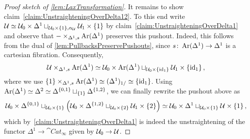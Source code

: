 \begin{proof}[Proof sketch of \cref{lem:LaxTransformation}]
	It remains to show claim~\cref{claim:UnstraighteningOverDelta12}. To this end write $\mathcal{U}\simeq \mathcal{U}_0\times\Delta^1\sqcup_{\mathcal{U}_0\times\{1\},\alpha_{\mathcal{U}}}\mathcal{U}_1\times\{1\}$ by claim~\cref{claim:UnstraighteningOverDelta1} and observe that $-\times_{\Delta^1,s}\operatorname{Ar}(\Delta^1)$ preserves this pushout. Indeed, this follows from the dual of \cref{lem:PullbacksPreservePushouts}, since $s\colon \operatorname{Ar}(\Delta^1)\rightarrow \Delta^1$ is a cartesian fibration. Consequently,
	\begin{equation*}
		\mathcal{U}\times_{\Delta^1,s}\operatorname{Ar}(\Delta^1)\simeq \mathcal{U}_0\times \operatorname{Ar}(\Delta^1)\sqcup_{\mathcal{U}_0\times \{\operatorname{id}_1\}}\mathcal{U}_1\times\{\operatorname{id}_1\}\,,
	\end{equation*}
	where we use $\{1\}\times_{\Delta^1,s}\operatorname{Ar}(\Delta^1)\simeq (\Delta^1)_{1/}\simeq \{\operatorname{id}_1\}$. Using $\operatorname{Ar}(\Delta^1)\simeq \Delta^2\simeq \Delta^{\{0,1\}}\sqcup_{\{1\}}\Delta^{\{1,2\}}$, we can finally rewrite the pushout above as
	\begin{equation*}
		\Uu_0\times\Delta^{\{0,1\}}\sqcup_{\Uu_0\times\{1\}}\left(\Uu_0\times\Delta^{\{1,2\}}\sqcup_{\Uu_0\times\{2\}}\Uu_1\times\{2\}\right)\simeq \Uu_0\times\Delta^1\sqcup_{\Uu_0\times\{1\}}\Uu\times\{1\}\,,
	\end{equation*}
	which by~\cref{claim:UnstraighteningOverDelta1} is indeed the unstraightening of the functor $\Delta^1\rightarrow \cat{Cat}_{\infty}$ given by $\mathcal{U}_0\rightarrow \mathcal{U}$.

\end{proof}
